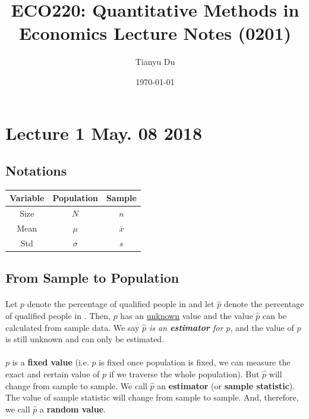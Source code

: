 \documentclass{article}
\title{ECO220: Quantitative Methods in Economics \newline Lecture Notes (0201)}
\author{Tianyu Du}
\date{\today}
\begin{document}
	\maketitle
	\tableofcontents
	
	\section{Lecture 1 May. 08 2018}
	\subsection{Notations}
			\begin{center}
			\begin{tabular}{|c|c|c|}
				\hline
				Variable & Population & Sample \\
				\hline
				Size & $N$ & $n$ \\
				\hline
				Mean & $\mu$ & $\overline{x}$ \\
				\hline
				Std & $\sigma$ & $s$ \\
				\hline
			\end{tabular}
		\end{center}
	
	\subsection{From Sample to Population}
	\paragraph{} Let $p$ denote the percentage of qualified people in  and let $\hat{p}$ denote the percentage of qualified people in . Then, $p$ has an \underline{unknown} value and the value $\hat{p}$ can be calculated from sample data. We say \emph{$\hat{p}$ is an \textbf{estimator} for $p$}, and the value of $p$ is still unknown and can only be estimated.
	\paragraph{}$p$ is a \textbf{fixed value} (i.e. $p$ is fixed once population is fixed, we can measure the exact and certain value of $p$ if we traverse the whole population). But $\hat{p}$ will change from sample to sample. We call $\hat{p}$ an \textbf{estimator} (or \textbf{sample statistic}). The value of sample statistic will change from sample to sample. And, therefore, we call $\hat{p}$ a \textbf{random value}.
	
\end{document}
